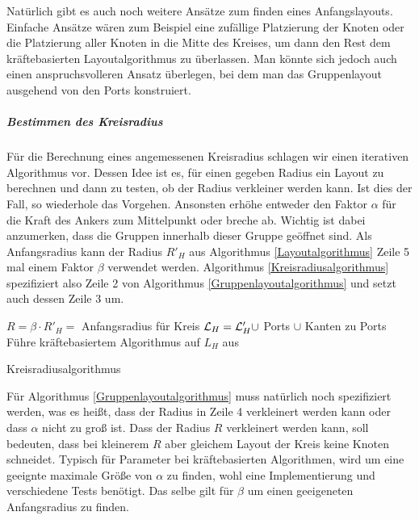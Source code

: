 Natürlich gibt es auch noch weitere Ansätze zum finden eines Anfangslayouts.
Einfache Ansätze wären zum Beispiel eine zufällige Platzierung der Knoten oder die Platzierung aller Knoten in die Mitte des Kreises, 
um dann den Rest dem kräftebasierten Layoutalgorithmus zu überlassen. 
Man könnte sich jedoch auch einen anspruchsvolleren Ansatz überlegen, bei dem man das Gruppenlayout ausgehend von den Ports konstruiert.


\subparagraph{Bestimmen des Kreisradius}

Für die Berechnung eines angemessenen Kreisradius schlagen wir einen iterativen Algorithmus vor. 
Dessen Idee ist es, für einen gegeben Radius ein Layout zu berechnen und dann zu testen, ob der Radius verkleiner werden kann. 
Ist dies der Fall, so wiederhole das Vorgehen. Ansonsten erhöhe entweder den Faktor $\alpha$ für die Kraft des Ankers zum Mittelpunkt oder breche ab. 
Wichtig ist dabei anzumerken, dass die Gruppen innerhalb dieser Gruppe geöffnet sind.
Als Anfangsradius kann der Radius $R'_H$ aus Algorithmus \ref{Layoutalgorithmus} Zeile 5 mal einem Faktor $\beta$ verwendet werden.
Algorithmus \ref{Kreisradiusalgorithmus} spezifiziert also Zeile 2 von Algorithmus  \ref{Gruppenlayoutalgorithmus} und setzt auch dessen Zeile 3 um.

\begin{algorithm}[H]
\label{Kreisradiusalgorithmus}
\SetAlgoLined
{}
$R = \beta \cdot R'_H = $ Anfangsradius für Kreis\;
$\mathcal{L}_H = \mathcal{L}'_H \cup$ Ports $\cup$  Kanten zu Ports\;
Führe kräftebasiertem Algorithmus auf  $L_H$ aus\;
\caption{Kreisradiusalgorithmus}
\end{algorithm}

Für Algorithmus \ref{Gruppenlayoutalgorithmus} muss natürlich noch spezifiziert werden, was es heißt, dass der Radius in Zeile 4 verkleinert werden kann
oder dass $\alpha$ nicht zu groß ist. 
Dass der Radius $R$ verkleinert werden kann, soll bedeuten, dass bei kleinerem $R$ aber gleichem Layout der Kreis keine Knoten schneidet. 
Typisch für Parameter bei kräftebasierten Algorithmen, wird um eine geeignte maximale Größe von $\alpha$ zu finden, wohl eine Implementierung und verschiedene Tests benötigt. 
Das selbe gilt für $\beta$ um einen geeigeneten Anfangsradius zu finden.

